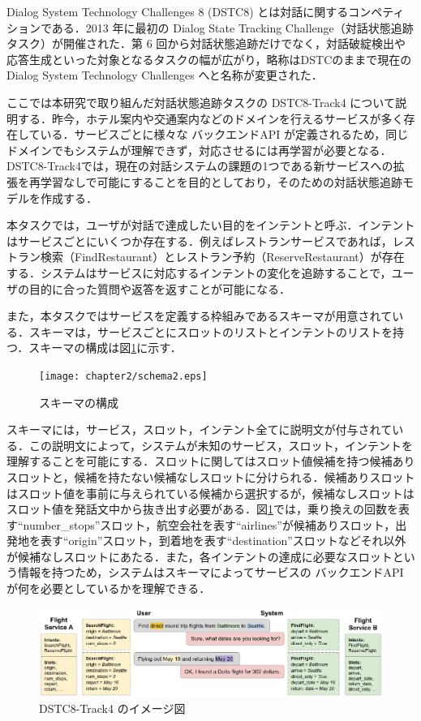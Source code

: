 Dialog System Technology Challenges 8 (DSTC8) \cite{dstc8}とは対話に関するコンペティションである．2013 年に最初の Dialog State Tracking Challenge（対話状態追跡タスク）が開催された．第 6 回から対話状態追跡だけでなく，対話破綻検出や応答生成といった対象となるタスクの幅が広がり，略称はDSTCのままで現在の Dialog System Technology Challenges へと名称が変更された．
\par
ここでは本研究で取り組んだ対話状態追跡タスクの DSTC8-Track4 について説明する．昨今，ホテル案内や交通案内などのドメインを行えるサービスが多く存在している．サービスごとに様々な バックエンドAPI が定義されるため，同じドメインでもシステムが理解できず，対応させるには再学習が必要となる．
DSTC8-Track4では，現在の対話システムの課題の1つである新サービスへの拡張を再学習なしで可能にすることを目的としており，そのための対話状態追跡モデルを作成する．
\par
本タスクでは，ユーザが対話で達成したい目的をインテントと呼ぶ．インテントはサービスごとにいくつか存在する．例えばレストランサービスであれば，レストラン検索（FindRestaurant）とレストラン予約（ReserveRestaurant）が存在する．システムはサービスに対応するインテントの変化を追跡することで，ユーザの目的に合った質問や返答を返すことが可能になる．
\par
また，本タスクではサービスを定義する枠組みであるスキーマが用意されている．スキーマは，サービスごとにスロットのリストとインテントのリストを持つ．スキーマの構成は図\ref{fig:schema}に示す．
\begin{figure}[thb]
    \centering
    \texttt{[image: chapter2/schema2.eps]}
    \caption{スキーマの構成}
    \label{fig:schema}
\end{figure}
スキーマには，サービス，スロット，インテント全てに説明文が付与されている．この説明文によって，システムが未知のサービス，スロット，インテントを理解することを可能にする．スロットに関してはスロット値候補を持つ候補ありスロットと，候補を持たない候補なしスロットに分けられる．候補ありスロットはスロット値を事前に与えられている候補から選択するが，候補なしスロットはスロット値を発話文中から抜き出す必要がある．図\ref{fig:schema}では，乗り換えの回数を表す“number\_stops”スロット，航空会社を表す“airlines”が候補ありスロット，出発地を表す“origin”スロット，到着地を表す“destination”スロットなどそれ以外が候補なしスロットにあたる．また，各インテントの達成に必要なスロットという情報を持つため，システムはスキーマによってサービスの バックエンドAPI が何を必要としているかを理解できる．
\par
\begin{figure}[t]
    \centering
    \includegraphics[width=15cm]{chapter2/dstc8-track4.eps}
    \caption{DSTC8-Track4 のイメージ図\cite{dstc8}}
    \label{fig:dstc8-track4}
\end{figure}
